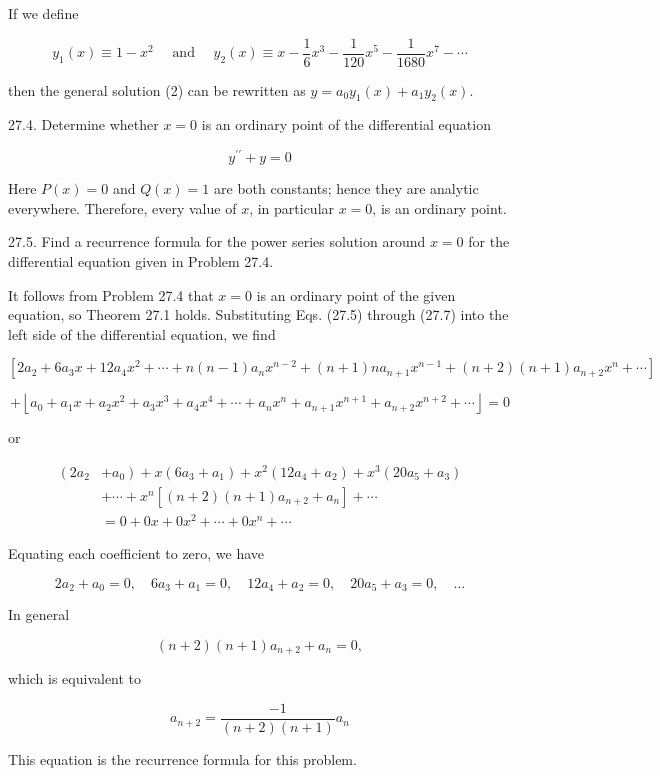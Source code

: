\documentclass[10pt]{article}
\begin{document}
If we define

$$
y_{1}(x) \equiv 1-x^{2} \quad \text { and } \quad y_{2}(x) \equiv x-\frac{1}{6} x^{3}-\frac{1}{120} x^{5}-\frac{1}{1680} x^{7}-\cdots
$$

then the general solution (2) can be rewritten as $y=a_{0} y_{1}(x)+a_{1} y_{2}(x)$.

27.4. Determine whether $x=0$ is an ordinary point of the differential equation

$$
y^{\prime \prime}+y=0
$$

Here $P(x)=0$ and $Q(x)=1$ are both constants; hence they are analytic everywhere. Therefore, every value of $x$, in particular $x=0$, is an ordinary point.

27.5. Find a recurrence formula for the power series solution around $x=0$ for the differential equation given in Problem 27.4.

It follows from Problem 27.4 that $x=0$ is an ordinary point of the given equation, so Theorem 27.1 holds. Substituting Eqs. (27.5) through (27.7) into the left side of the differential equation, we find

$$
\left[2 a_{2}+6 a_{3} x+12 a_{4} x^{2}+\cdots+n(n-1) a_{n} x^{n-2}+(n+1) n a_{n+1} x^{n-1}+(n+2)(n+1) a_{n+2} x^{n}+\cdots\right]
$$

$$
+\left\lfloor a_{0}+a_{1} x+a_{2} x^{2}+a_{3} x^{3}+a_{4} x^{4}+\cdots+a_{n} x^{n}+a_{n+1} x^{n+1}+a_{n+2} x^{n+2}+\cdots\right\rfloor=0
$$

or

$$
\begin{aligned}
\left(2 a_{2}\right. & \left.+a_{0}\right)+x\left(6 a_{3}+a_{1}\right)+x^{2}\left(12 a_{4}+a_{2}\right)+x^{3}\left(20 a_{5}+a_{3}\right) \\
& +\cdots+x^{n}\left[(n+2)(n+1) a_{n+2}+a_{n}\right]+\cdots \\
& =0+0 x+0 x^{2}+\cdots+0 x^{n}+\cdots
\end{aligned}
$$

Equating each coefficient to zero, we have

$$
2 a_{2}+a_{0}=0, \quad 6 a_{3}+a_{1}=0, \quad 12 a_{4}+a_{2}=0, \quad 20 a_{5}+a_{3}=0, \quad \ldots
$$

In general

$$
(n+2)(n+1) a_{n+2}+a_{n}=0,
$$

which is equivalent to

$$
a_{n+2}=\frac{-1}{(n+2)(n+1)} a_{n}
$$

This equation is the recurrence formula for this problem.
\end{document}
